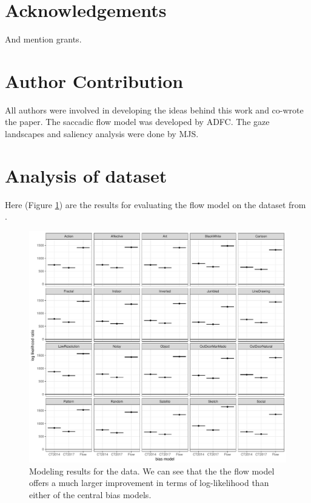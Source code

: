 \documentclass[a4paper, twocolumn, oneside, 11pt]{article}
\begin{document}
\section*{Acknowledgements}

And mention grants. 

\section*{Author Contribution}

All authors were involved in developing the ideas behind this work and co-wrote the paper. The saccadic flow model was developed by ADFC. The gaze landscapes and saliency analysis were done by MJS.

\appendix



\section{Analysis of \cite{borji2015} dataset}

Here (Figure \ref{fig:nFlowDevBorji}) are the results for evaluating the flow model on the dataset from \cite{borji2015}.

\begin{figure}
\centering
 \includegraphics[width=13cm]{../scripts/flow/figs/llh_trainingBorji.pdf}
\caption{Modeling results for the \cite{borji2015} data. We can see that the the flow model offers a much larger improvement in terms of log-likelihood than either of the central bias models.}
\label{fig:nFlowDevBorji}
\end{figure}


\small

\end{document}
